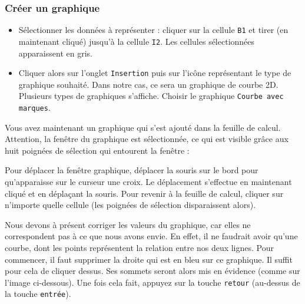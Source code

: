 \subsubsection{Créer un graphique}

\begin{itemize}
\item Sélectionner les données à représenter : cliquer sur la cellule \texttt{B1} et tirer (en maintenant cliqué) jusqu'à la cellule \texttt{I2}. Les cellules sélectionnées apparaissent en gris.

\item Cliquer alors sur l'onglet \texttt{Insertion} puis sur l'icône représentant le type de graphique souhaité. Dans notre cas, ce sera un graphique de courbe 2D.  Plusieurs types de graphiques s'affiche. Choisir le graphique \texttt{Courbe avec marques}. 
\end{itemize}

Vous avez maintenant un graphique qui s'est ajouté dans la feuille de calcul. Attention, la fenêtre du graphique est sélectionnée, ce qui est visible grâce aux huit poignées de sélection qui entourent la fenêtre :


Pour déplacer la fenêtre graphique, déplacer la souris sur le bord pour qu'apparaisse sur le curseur une croix. Le déplacement s'effectue en maintenant cliqué et en déplaçant la souris. Pour revenir à la feuille de calcul, cliquer sur n'importe quelle cellule (les poignées de sélection disparaissent alors).

Nous devons à présent corriger les valeurs du graphique, car elles ne correspondent pas à ce que nous avons envie. En effet, il ne faudrait avoir qu'une courbe, dont les points représentent la relation entre nos deux lignes. Pour commencer, il faut supprimer la droite qui est en bleu sur ce graphique. Il suffit pour cela de cliquer dessus. Ses sommets seront alors mis en évidence (comme sur l'image ci-dessous). Une fois cela fait, appuyez sur la touche \texttt{retour} (au-dessus de la touche \texttt{entrée}).


